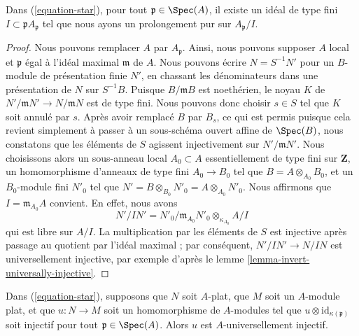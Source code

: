 \begin{lemma}
\label{lemma-find-pure-spreadout}
Dans (\ref{equation-star}), pour tout $\mathfrak p \in \Spec(A)$,
il existe un idéal de type fini $I \subset \mathfrak pA_\mathfrak p$
tel que nous ayons un prolongement pur sur $A_\mathfrak p/I$.
\end{lemma}

\begin{proof}
Nous pouvons remplacer $A$ par $A_\mathfrak p$. Ainsi, nous pouvons supposer $A$
local et $\mathfrak p$ égal à l'idéal maximal $\mathfrak m$ de $A$.
Nous pouvons écrire $N = S^{-1}N'$ pour un $B$-module de présentation finie $N'$,
en chassant les dénominateurs dans une présentation de $N$ sur $S^{-1}B$.
Puisque $B/\mathfrak m B$ est noethérien, le noyau $K$ de
$N'/\mathfrak m N' \to N/\mathfrak m N$ est de type fini.
Nous pouvons donc choisir $s \in S$ tel que $K$ soit annulé par $s$.
Après avoir remplacé $B$ par $B_s$, ce qui est permis puisque cela revient simplement à passer
à un sous-schéma ouvert affine de $\Spec(B)$, nous constatons que les éléments de $S$
agissent injectivement sur $N'/\mathfrak m N'$. Nous choisissons alors
un sous-anneau local $A_0 \subset A$ essentiellement de type fini sur $\mathbf{Z}$,
un homomorphisme d'anneaux de type fini $A_0 \to B_0$ tel que $B = A \otimes_{A_0} B_0$,
et un $B_0$-module fini $N'_0$ tel que
$N' = B \otimes_{B_0} N'_0 = A \otimes_{A_0} N'_0$.
Nous affirmons que $I = \mathfrak m_{A_0} A$ convient.
En effet, nous avons
$$
N'/IN' = N'_0/\mathfrak m_{A_0} N'_0 \otimes_{\kappa_{A_0}} A/I
$$
qui est libre sur $A/I$. La multiplication par les éléments de $S$
est injective après passage au quotient par l'idéal maximal ; par conséquent,
$N'/IN' \to N/IN$ est universellement injective, par exemple d'après le
lemme \ref{lemma-invert-universally-injective}.
\end{proof}

\begin{lemma}
\label{lemma-universally-injective-if-flat}
Dans (\ref{equation-star}), supposons que $N$ soit $A$-plat, que $M$ soit un $A$-module plat,
et que $u : N \to M$ soit un homomorphisme de $A$-modules tel que
$u \otimes \text{id}_{\kappa(\mathfrak p)}$ soit injectif pour tout
$\mathfrak p \in \Spec(A)$. Alors $u$ est $A$-universellement injectif.
\end{lemma}

